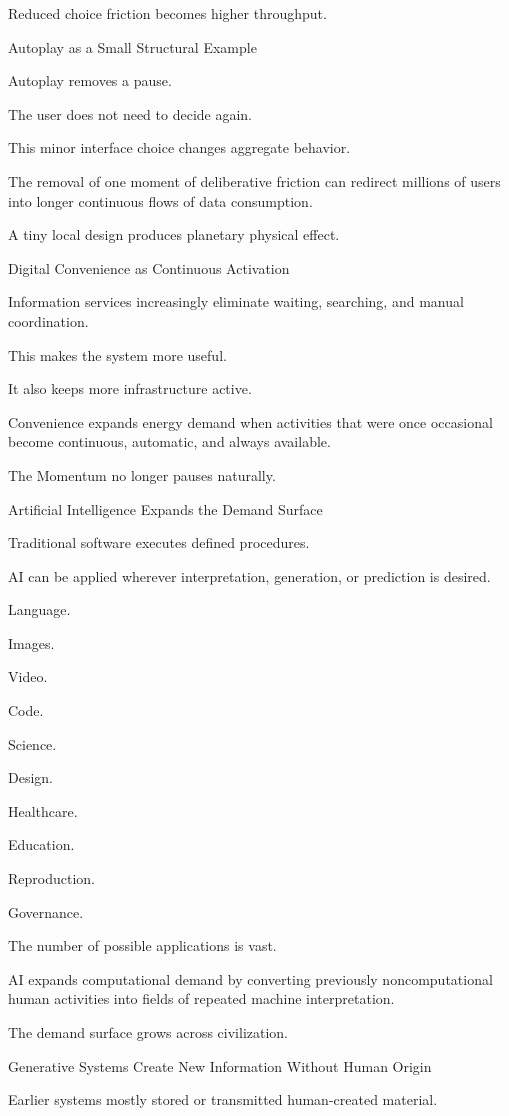 Reduced choice friction becomes higher throughput.

Autoplay as a Small Structural Example

Autoplay removes a pause.

The user does not need to decide again.

This minor interface choice changes aggregate behavior.

The removal of one moment of deliberative friction can redirect millions of users into longer continuous flows of data consumption.

A tiny local design produces planetary physical effect.

Digital Convenience as Continuous Activation

Information services increasingly eliminate waiting, searching, and manual coordination.

This makes the system more useful.

It also keeps more infrastructure active.

Convenience expands energy demand when activities that were once occasional become continuous, automatic, and always available.

The Momentum no longer pauses naturally.

Artificial Intelligence Expands the Demand Surface

Traditional software executes defined procedures.

AI can be applied wherever interpretation, generation, or prediction is desired.

Language.

Images.

Video.

Code.

Science.

Design.

Healthcare.

Education.

Reproduction.

Governance.

The number of possible applications is vast.

AI expands computational demand by converting previously noncomputational human activities into fields of repeated machine interpretation.

The demand surface grows across civilization.

Generative Systems Create New Information Without Human Origin

Earlier systems mostly stored or transmitted human-created material.

